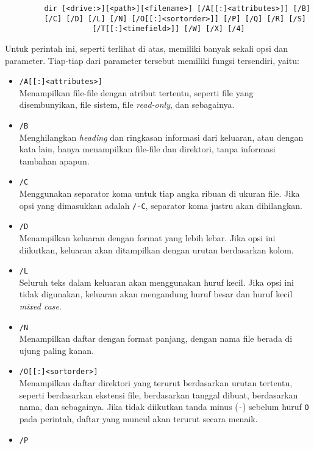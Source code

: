 \begin{itemize}
	\begin{verbatim}
         dir [<drive:>][<path>][<filename>] [/A[[:]<attributes>]] [/B] 
         [/C] [/D] [/L] [/N] [/O[[:]<sortorder>]] [/P] [/Q] [/R] [/S] 
                    [/T[[:]<timefield>]] [/W] [/X] [/4]
	\end{verbatim}
	
	Untuk perintah ini, seperti terlihat di atas, memiliki banyak sekali opsi dan parameter. Tiap-tiap dari parameter tersebut memiliki fungsi tersendiri, yaitu:
	\begin{itemize}
		\item \verb|/A[[:]<attributes>]|\\
		Menampilkan file-file dengan atribut tertentu, seperti file yang disembunyikan, file sistem, file \textit{read-only}, dan sebagainya.
		\item \verb|/B|\\
		Menghilangkan \textit{heading} dan ringkasan informasi dari keluaran, atau dengan kata lain, hanya menampilkan file-file dan direktori, tanpa informasi tambahan apapun.
		\item \verb|/C|\\
		Menggunakan separator koma untuk tiap angka ribuan di ukuran file. Jika opsi yang dimasukkan adalah \verb|/-C|, separator koma justru akan dihilangkan.
		\item \verb|/D|\\
		Menampilkan keluaran dengan format yang lebih lebar. Jika opsi ini diikutkan, keluaran akan ditampilkan dengan urutan berdasarkan kolom.
		\item \verb|/L|\\
		Seluruh teks dalam keluaran akan menggunakan huruf kecil. Jika opsi ini tidak digunakan, keluaran akan mengandung huruf besar dan huruf kecil \textit{mixed case}.
		\item \verb|/N|\\
		Menampilkan daftar dengan format panjang, dengan nama file berada di ujung paling kanan.
		\newpage \enlargethispage{1.5\baselineskip} %
		\item \verb|/O[[:]<sortorder>]|\\
		Menampilkan daftar direktori yang terurut berdasarkan urutan tertentu, seperti berdasarkan ekstensi file, berdasarkan tanggal dibuat, berdasarkan nama, dan sebagainya. Jika tidak diikutkan tanda minus (\verb|-|) sebelum huruf \verb|O| pada perintah, daftar yang muncul akan terurut secara menaik.
		\item \verb|/P|\\

\end{itemize}
\end{itemize}
